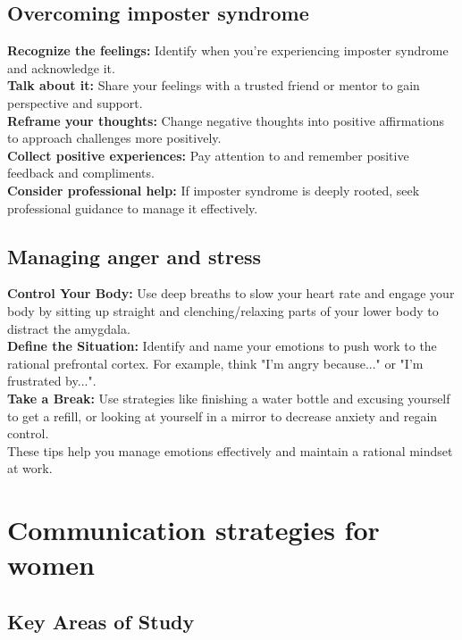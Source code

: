\documentclass[12pt]{article}
\begin{document}
\subsection{Overcoming imposter syndrome}
\textbf{Recognize the feelings:} Identify when you're experiencing imposter syndrome and acknowledge it.\\
\textbf{Talk about it:} Share your feelings with a trusted friend or mentor to gain perspective and support.\\
\textbf{Reframe your thoughts:} Change negative thoughts into positive affirmations to approach challenges more positively.\\
\textbf{Collect positive experiences:}  Pay attention to and remember positive feedback and compliments.\\
\textbf{Consider professional help:}  If imposter syndrome is deeply rooted, seek professional guidance to manage it effectively.\\

\subsection{Managing anger and stress}
\textbf{Control Your Body:}  Use deep breaths to slow your heart rate and engage your body by sitting up straight and clenching/relaxing parts of your lower body to distract the amygdala.\\
\textbf{Define the Situation:}  Identify and name your emotions to push work to the rational prefrontal cortex. For example, think "I'm angry because..." or "I'm frustrated by...".\\
\textbf{Take a Break:} Use strategies like finishing a water bottle and excusing yourself to get a refill, or looking at yourself in a mirror to decrease anxiety and regain control.\\

These tips help you manage emotions effectively and maintain a rational mindset at work.\\


\section{ Communication strategies for women}

\subsection{Key Areas of Study}
\end{document}
